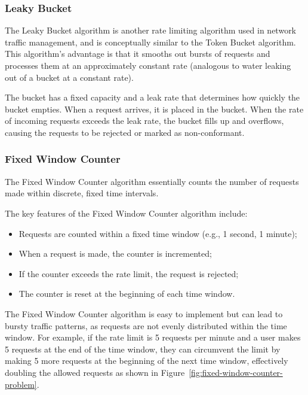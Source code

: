 \subsubsection{Leaky Bucket}\label{subsubsec:leaky-bucket-algorithm}

The Leaky Bucket algorithm is another rate limiting algorithm used in network traffic management, and is conceptually similar to the Token Bucket algorithm.
This algorithm's advantage is that it smooths out bursts of requests
and processes them at an approximately constant rate (analogous to water leaking out of a bucket at a constant rate).

The bucket has a fixed capacity and a leak rate that determines how quickly the bucket empties.
When a request arrives, it is placed in the bucket.
When the rate of incoming requests exceeds the leak rate, the bucket fills up and overflows,
causing the requests to be rejected or marked as non-conformant.

\subsubsection{Fixed Window Counter}\label{subsubsec:fixed-window-counter-algorithm}

The Fixed Window Counter algorithm essentially counts the number of requests made within discrete,
fixed time intervals.

The key features of the Fixed Window Counter algorithm include:

\begin{itemize}
    \item Requests are counted within a fixed time window (e.g., 1 second, 1 minute);
    \item When a request is made, the counter is incremented;
    \item If the counter exceeds the rate limit, the request is rejected;
    \item The counter is reset at the beginning of each time window.
\end{itemize}

The Fixed Window Counter algorithm is easy to implement but can lead to bursty traffic patterns, as requests are not evenly distributed within the time window.
For example, if the rate limit is 5 requests per minute and a user makes 5 requests at the end of the time window, they can circumvent the limit by making 5 more requests at the beginning of the next time window, effectively doubling the allowed requests as shown in Figure~\ref{fig:fixed-window-counter-problem}.

